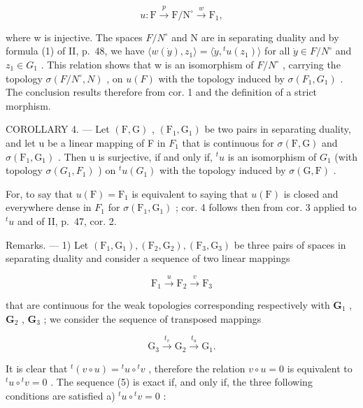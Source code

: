 \[
u: \mathrm{F} \xrightarrow {p} \mathrm{F} / \mathrm{N} ^ {\circ} \xrightarrow {w} \mathrm{F} _ {1},
\]

where w is injective. The spaces \(F/N^{\circ}\) and N are in separating duality and by formula (1) of II, p.~48, we have \(\langle w(\dot{y}), z_{1} \rangle = \langle \dot{y}, {}^{t}u(z_{1}) \rangle\) for all \(\dot{y} \in F/N^{\circ}\) and \(z_{1} \in G_{1}\) . This relation shows that w is an isomorphism of \(F/N^{\circ}\) , carrying the topology \(\sigma(F/N^{\circ}, N)\) , on \(u(F)\) with the topology induced by \(\sigma(F_{1}, G_{1})\) . The conclusion results therefore from cor. 1 and the definition of a strict morphism.

COROLLARY 4. --- Let \((\mathrm{F}, \mathrm{G})\) , \((\mathrm{F}_{1}, \mathrm{G}_{1})\) be two pairs in separating duality, and let u be a linear mapping of F in \(F_{1}\) that is continuous for \(\sigma(\mathrm{F}, \mathrm{G})\) and \(\sigma(\mathrm{F}_{1}, \mathrm{G}_{1})\) . Then u is surjective, if and only if, \(^{t}u\) is an isomorphism of \(G_{1}\) (with topology \(\sigma(G_{1}, F_{1})\) ) on \(^{t}u(G_{1})\) with the topology induced by \(\sigma(\mathrm{G}, \mathrm{F})\) .

For, to say that \(u(\mathrm{F}) = \mathrm{F}_{1}\) is equivalent to saying that \(u(\mathrm{F})\) is closed and everywhere dense in \(F_{1}\) for \(\sigma(\mathrm{F}_{1}, \mathrm{G}_{1})\) ; cor. 4 follows then from cor. 3 applied to \(^{t}u\) and of II, p.~47, cor. 2.

Remarks. --- 1) Let \((\mathrm{F}_1, \mathrm{G}_1), (\mathrm{F}_2, \mathrm{G}_2), (\mathrm{F}_3, \mathrm{G}_3)\) be three pairs of spaces in separating duality and consider a sequence of two linear mappings

\[
\mathrm{F} _ {1} \xrightarrow {u} \mathrm{F} _ {2} \xrightarrow {v} \mathrm{F} _ {3}\tag{5}
\]

that are continuous for the weak topologies corresponding respectively with \(\mathbf{G}_1\) , \(\mathbf{G}_2\) , \(\mathbf{G}_3\) ; we consider the sequence of transposed mappings

\[
\mathrm{G} _ {3} \stackrel {{t _ {v}}} {{\to}} \mathrm{G} _ {2} \stackrel {{t _ {u}}} {{\to}} \mathrm{G} _ {1}.\tag{6}
\]

It is clear that \({}^t (v\circ u) = {}^t u\circ {}^tv\) , therefore the relation \(v\circ u = 0\) is equivalent to \({}^t u\circ {}^tv = 0\) . The sequence (5) is exact if, and only if, the three following conditions are satisfied a) \({}^t u\circ {}^tv = 0\) :

